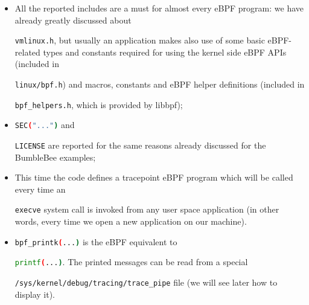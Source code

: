 \begin{itemize}
	\item 
		All the reported includes are a must for almost every eBPF program: we have already	greatly discussed about \raggedright\colorbox{backcolour}{\lstinline[style=commandline, language=bash]|vmlinux.h|}, but usually an application makes also use of some basic eBPF-related types and constants required for using the kernel side eBPF APIs (included in \raggedright\colorbox{backcolour}{\lstinline[style=commandline, language=bash]|linux/bpf.h|}) and macros, constants and eBPF helper definitions (included in \raggedright\colorbox{backcolour}{\lstinline[style=commandline, language=bash]|bpf_helpers.h|}, which is provided by libbpf);
	\item 
		\raggedright\colorbox{backcolour}{\lstinline[style=commandline, language=bash]|SEC("...")|} and \raggedright\colorbox{backcolour}{\lstinline[style=commandline, language=bash]|LICENSE|} are reported for the same reasons already discussed for the BumbleBee examples;
	\item 
		This time the code defines a tracepoint eBPF program which will be called every time an \raggedright\colorbox{backcolour}{\lstinline[style=commandline, language=bash]|execve|} system call is invoked from any user space application (in other words, every time we open a new application on our machine).
	\item 
		\raggedright\colorbox{backcolour}{\lstinline[style=commandline, language=bash]|bpf_printk(...)|} is the eBPF equivalent to \raggedright\colorbox{backcolour}{\lstinline[style=commandline, language=bash]|printf(...)|}. 
		The printed messages can be read from a special \raggedright\colorbox{backcolour}{\lstinline[style=commandline, language=bash]|/sys/kernel/debug/tracing/trace_pipe|} file (we will see later how to display it).
\end{itemize}

